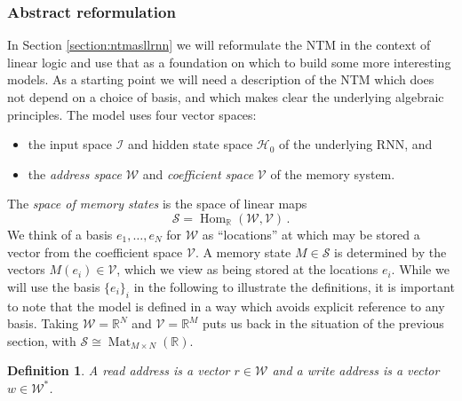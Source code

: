\documentclass[english,letter paper,12pt,leqno]{article}
\theoremstyle{example}
\newtheorem{definition}[theorem]{Definition}
\numberwithin{equation}{section}
\def\Hom{\operatorname{Hom}}
\begin{document}
\subsubsection{Abstract reformulation}\label{section:abstract_ntm}

In Section \ref{section:ntmasllrnn} we will reformulate the NTM in the context of linear logic and use that as a foundation on which to build some more interesting models. As a starting point we will need a description of the NTM which does not depend on a choice of basis, and which makes clear the underlying algebraic principles. The model uses four vector spaces:
\begin{itemize}
\item the input space $\mathscr{I}$ and hidden state space $\mathscr{H}_0$ of the underlying RNN, and
\item the \emph{address space} $\mathscr{W}$ and \emph{coefficient space} $\mathscr{V}$ of the memory system.
\end{itemize}
The \emph{space of memory states} is the space of linear maps
\[
\mathscr{S} = \Hom_{\mathbb{R}}(\mathscr{W}, \mathscr{V})\,.
\]
We think of a basis $e_1,\ldots,e_N$ for $\mathscr{W}$ as ``locations'' at which may be stored a vector from the coefficient space $\mathscr{V}$. A memory state $M \in \mathscr{S}$ is determined by the vectors $M(e_i) \in \mathscr{V}$, which we view as being stored at the locations $e_i$. While we will use the basis $\{ e_i \}_i$ in the following to illustrate the definitions, it is important to note that the model is defined in a way which avoids explicit reference to any basis. Taking $\mathscr{W} = \mathbb{R}^N$ and $\mathscr{V} = \mathbb{R}^M$ puts us back in the situation of the previous section, with $\mathscr{S} \cong \operatorname{Mat}_{M \times N}(\mathbb{R})$.


\begin{definition} A \emph{read address} is a vector $r \in \mathscr{W}$ and a \emph{write address} is a vector $w \in \mathscr{W}^*$.
\end{definition}
\end{document}
